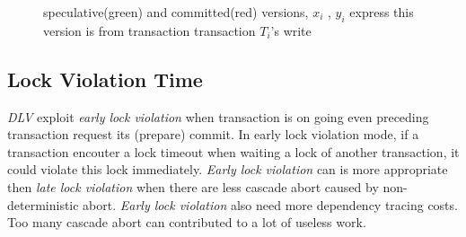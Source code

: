 \documentclass[conference]{IEEEtran}
\begin{document}
\begin{figure}[htbp]
{  }
  \caption{speculative(green) and committed(red) versions,
  ${x_i}$ , ${y_i}$ express this version is from transaction transaction ${T_i}$'s write
}
\label{fig:versions_example}
\end{figure}

\subsection {Lock Violation Time}

\emph{DLV} exploit \emph{early lock violation}
when transaction is on going even preceding transaction request its (prepare) commit.
In early lock violation mode,
if a transaction encouter a lock timeout when waiting a lock of another transaction, 
it could violate this lock immediately.
\emph{Early lock violation} can is more appropriate then \emph{late lock violation} when there are less cascade abort caused by non-deterministic abort.
\emph{Early lock violation} also need more dependency tracing costs.
Too many cascade abort can contributed to a lot of useless work.
\end{document}
